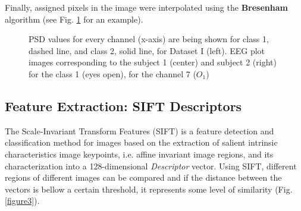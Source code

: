\documentclass[nouppercase]{ifmbe}
\begin{document}
Finally, assigned pixels in the image were interpolated using the \textbf{Bresenham} \cite{c89} algorithm (see Fig. \ref{figure1} for an example).


   \begin{figure}[thpb]
      \centering
      \setlength\fboxsep{0pt}
	  \setlength\fboxrule{0.5pt}
      \caption{PSD values for every channel (x-axis) are being shown for class 1, dashed line, and class 2, solid line, for Dataset I (left). EEG plot images corresponding to the subject 1 (center) and subject 2 (right) for the class 1 (eyes open), for the channel 7 ($ O_1 $) }
      \label{figure1}
   \end{figure}

   
\subsection{Feature Extraction: SIFT Descriptors} 





The Scale-Invariant Transform Features (SIFT)\cite{c14} is a feature detection and classification method for images based on the extraction of salient intrinsic characteristics image keypoints, i.e. affine invariant image regions, and its characterization into a 128-dimensional  \textit{Descriptor} vector.  Using SIFT, different regions of different images can be compared and if the distance between the vectors is bellow a certain threshold, it represents some level of similarity (Fig. \ref{figure3}).  
\end{document}
